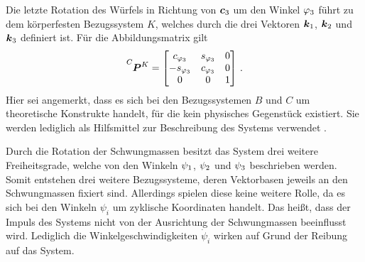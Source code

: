 Die letzte Rotation des Würfels in Richtung von $\boldsymbol{c}_{\text{3}}$ um den Winkel $\varphi_{\text{3}}$ führt zu dem körperfesten Bezugssystem $K$, welches durch die drei Vektoren $\boldsymbol{k}_{\text{1}}$, $\boldsymbol{k}_{\text{2}}$ und $\boldsymbol{k}_{\text{3}}$ definiert ist. Für die Abbildungsmatrix gilt 
\begin{equation}
\pMat{C}{K} = \begin{bmatrix}
c_{\varphi\idx3} & s_{\varphi\idx3} & 0 \\ -s_{\varphi\idx3} & c_{\varphi\idx3} & 0 \\ 0 & 0 & 1
\end{bmatrix} \,.
\end{equation}
Hier sei angemerkt, dass es sich bei den Bezugssystemen $B$ und $C$ um theoretische Konstrukte handelt, für die kein physisches Gegenstück existiert. Sie werden lediglich als Hilfsmittel zur Beschreibung des Systems verwendet \cite[S. 24 ff.]{KaneBook}.

Durch die Rotation der Schwungmassen besitzt das System drei weitere Freiheitsgrade, welche von den Winkeln $\psi_{\text{1}}$, $\psi_{\text{2}}$ und $\psi_{\text{3}}$ beschrieben werden. Somit entstehen drei weitere Bezugssysteme, deren Vektorbasen jeweils an den Schwungmassen fixiert sind. Allerdings spielen diese keine weitere Rolle, da es sich bei den Winkeln $\psi_i$ um zyklische Koordinaten handelt. Das heißt, dass der Impuls des Systems nicht von der Ausrichtung der Schwungmassen beeinflusst wird. Lediglich die Winkelgeschwindigkeiten $\dot{\psi}_i$ wirken auf Grund der Reibung auf das System.

